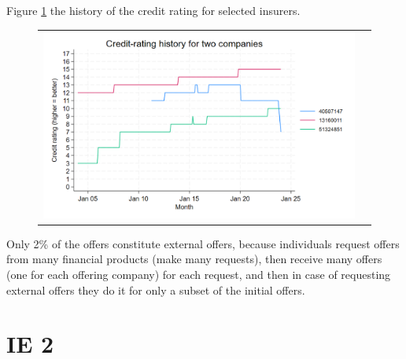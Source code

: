 \documentclass[12pt]{article}
\begin{document}
Figure \ref{fig:ie1_1} the history of the credit rating for selected insurers.  
\begin{figure}[H] \label{fig:ie1_1}
\caption{}
\centering{}%
\begin{tabular}{cc}
\includegraphics[scale=0.27]{figures/IE1_credit_history.png}
\end{tabular}
\end{figure}

Only 2\% of the offers constitute external offers, because individuals request offers from many financial products (make many requests), then receive many offers (one for each offering company) for each request, and then in case of requesting external offers they do it for only a subset of the initial offers. 

\section{IE 2}
\end{document}
